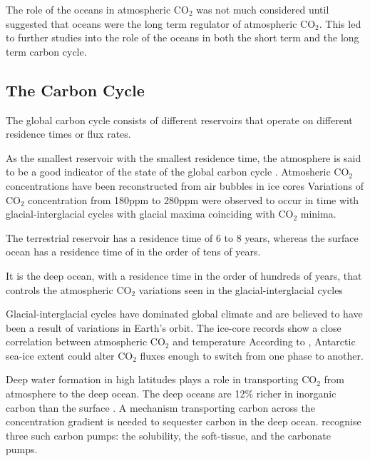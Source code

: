 \documentclass[11pt, a4paper]{article}
\numberwithin{figure}{section}
\numberwithin{table}{section}
\begin{document}
The role of the oceans in atmospheric CO$_2$ was not much considered until 
\citet{Revelle2010}%
suggested that oceans were the long term regulator of 
atmospheric CO$_2$. This led to further studies into the role of the oceans 
in both the short term and the long term carbon cycle.

\subsection{The Carbon Cycle}
The global carbon cycle consists of different reservoirs that operate on 
different residence times or flux rates. 

As the smallest reservoir with the smallest residence time, the atmosphere is 
said to be a good indicator of the state of the global carbon cycle 
\cite{Sarmiento2006}. %
Atmosheric CO$_2$ concentrations have been reconstructed from air bubbles in ice 
cores 
\cite{Indermuhle1999, Petit1999}%
Variations of CO$_2$ concentration from 180ppm to 280ppm were observed to 
occur in time with glacial-interglacial cycles with glacial maxima coinciding 
with CO$_2$ minima.

The terrestrial reservoir has a residence time of 6 to 8 years, whereas the surface 
ocean has a residence time of in the order of tens of years. 

It is the deep ocean, with a residence time in the order of hundreds of years, 
that controls the atmospheric CO$_2$ variations seen in the glacial-interglacial cycles 
\cite{Sarmiento2006}%

Glacial-interglacial cycles have dominated global climate 
\cite{Sigman2000}%
and are believed to have been a result of variations 
in Earth's orbit. 
The ice-core records show a close correlation between 
atmospheric CO$_2$ and temperature 
\cite{Jouzel1987}%
According to 
\citet{Paillard2004},%
Antarctic sea-ice extent could alter CO$_2$ fluxes enough 
to switch from one phase to another. 

Deep water formation in high latitudes 
plays a role in transporting CO$_2$ from atmosphere to the deep ocean.
The deep oceans are 12\% richer in inorganic carbon than the surface 
\cite{Sarmiento1994}.%
A mechanism transporting carbon across the 
concentration gradient is needed to sequester carbon in the deep ocean. 
\citet{VolkHoffart1985}%
recognise three such carbon pumps: the solubility, 
the soft-tissue, and the carbonate pumps.
\end{document}

